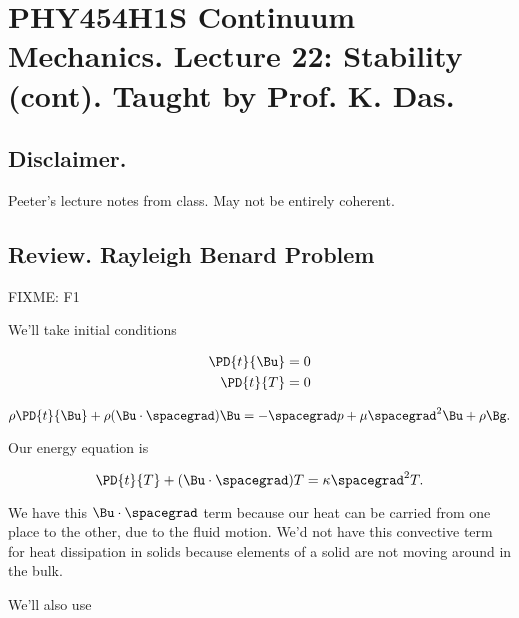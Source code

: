 
%

\chapter{PHY454H1S Continuum Mechanics.  Lecture 22: Stability (cont).  Taught by Prof. K. Das.}
\label{chap:continuumL22}
{}
\date{Apr 4, 2012}

\beginArtWithToc

\section{Disclaimer.}

Peeter's lecture notes from class.  May not be entirely coherent.

\section{Review.  Rayleigh Benard Problem}

FIXME: F1

We'll take initial conditions

\begin{align}\label{eqn:continuumL22:10}
\PD{t}{\Bu} &= 0 \\
\PD{t}{T} &= 0
\end{align}

\begin{equation}\label{eqn:continuumL22:30}
\rho \PD{t}{\Bu} + \rho (\Bu \cdot \spacegrad) \Bu = - \spacegrad p + \mu \spacegrad^2 \Bu + \rho \Bg.
\end{equation}

Our energy equation is

\begin{equation}\label{eqn:continuumL22:50}
\PD{t}{T} + (\Bu \cdot \spacegrad) T = \kappa \spacegrad^2 T.
\end{equation}

We have this $\Bu \cdot \spacegrad$ term because our heat can be carried from one place to the other, due to the fluid motion.  We'd not have this convective term for heat dissipation in solids because elements of a solid are not moving around in the bulk.

We'll also use 

